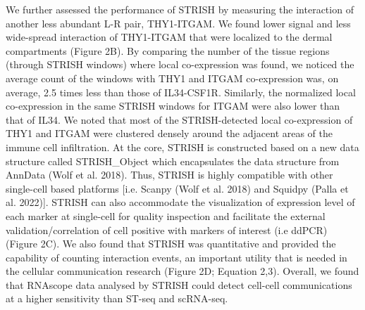 We further assessed the performance of STRISH by measuring the interaction of another less abundant L-R pair, THY1-ITGAM. We found lower signal and less wide-spread interaction of THY1-ITGAM that were localized to the dermal compartments (Figure 2B). By comparing the number of the tissue regions (through STRISH windows) where local co-expression was found, we noticed the average count of the windows with THY1 and ITGAM co-expression was, on average, 2.5 times less than those of IL34-CSF1R. Similarly, the normalized local co-expression in the same STRISH windows for ITGAM were also lower than that of IL34. We noted that most of the STRISH-detected local co-expression of THY1 and ITGAM were clustered densely around the adjacent areas of the immune cell infiltration. At the core, STRISH is constructed based on a new data structure called STRISH\_Object which encapsulates the data structure from AnnData (Wolf et al. 2018). Thus, STRISH is highly compatible with other single-cell based platforms [i.e. Scanpy (Wolf et al. 2018) and Squidpy (Palla et al. 2022)]. STRISH can also accommodate the visualization of expression level of each marker at single-cell for quality inspection and facilitate the external validation/correlation of cell positive with markers of interest (i.e ddPCR) (Figure 2C). We also found that STRISH was quantitative and provided the capability of counting interaction events, an important utility that is needed in the cellular communication research (Figure 2D; Equation 2,3). Overall, we found that RNAscope data analysed by STRISH could detect cell-cell communications at a higher sensitivity than ST-seq and scRNA-seq. 
